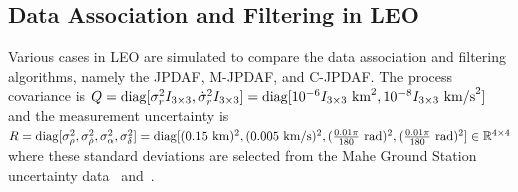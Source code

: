 
\subsection{Data Association and Filtering in LEO}

Various cases in LEO are simulated to compare the data association and filtering algorithms, namely the JPDAF, M-JPDAF, and C-JPDAF.
The process covariance is $Q=\diag[\sigma^2_rI_{3\times3},\dot\sigma^2_rI_{3\times3}]=\diag[10^{-6}I_{3\times3}\ \text{km}^2, 10^{-8}I_{3\times3}\ \text{km/s}^2]$ and the measurement uncertainty is $R=\diag[\sigma_\rho^2, \sigma_{\dot\rho}^2, \sigma_\alpha^2, \sigma_\delta^2]=\diag[(0.15\ \text{km})^2, (0.005\ \text{km/s})^2,\\ (\frac{0.01\pi}{180}\ \text{rad})^2, (\frac{0.01\pi}{180}\ \text{rad})^2]\in\Re^{4\times4}$ where these standard deviations are selected from the Mahe Ground Station uncertainty data~\cite{VerSauSco04} and~\cite{KurAriAriEfe10}.

